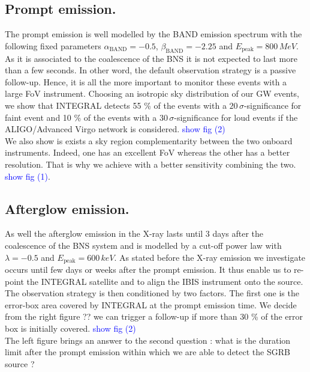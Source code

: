 \documentclass[a0,portrait]{a0poster}
\begin{document}
\begin{multicols}{2}
\subsection*{Prompt emission.}

The prompt emission is well modelled by the BAND emission spectrum with the following fixed parameters $\alpha_{\mathrm{BAND}} = - 0.5$, $\beta_{\mathrm{BAND}} = - 2.25$ and $E_{\mathrm{peak}} = 800 \, MeV$. As it is associated to the coalescence of the BNS it is not expected to last more than a few seconds. In other word, the default observation strategy is a passive follow-up. Hence, it is all the more important to monitor these events with a large FoV instrument. Choosing an isotropic sky distribution of our GW events, we show that INTEGRAL detects 55 \% of the events with a $20 \, \sigma$-significance for faint event and 10 \% of the events with a $30 \, \sigma$-significance for loud events if the ALIGO/Advanced Virgo network is considered. \textcolor{blue}{show fig (2)} \\
\indent We also show is exists a sky region complementarity between the two onboard instruments. Indeed, one has an excellent FoV whereas the other has a better resolution. That is why we achieve with a better sensitivity combining the two. \textcolor{blue}{show fig (1)}.


\subsection*{Afterglow emission.}


As well the afterglow emission in the X-ray lasts until 3 days after the coalescence of the BNS system and is modelled by a cut-off power law with $\lambda = - 0.5$ and $E_{\mathrm{peak}} = 600 \, keV$. As stated before the X-ray emission we investigate occurs until few days or weeks after the prompt emission. It thus enable us to re-point the INTEGRAL satellite and to align the IBIS instrument onto the source. The observation strategy is then conditioned by two factors. The first one is the error-box area covered by INTEGRAL at the prompt emission time. We decide from the right figure ?? we can trigger a follow-up if more than 30 \% of the error box is initially covered. \textcolor{blue}{show fig (2)} \\
The left figure brings an answer to the second question : what is the duration limit after the prompt emission within which we are able to detect the SGRB source ? 


\end{multicols}
\end{document}
